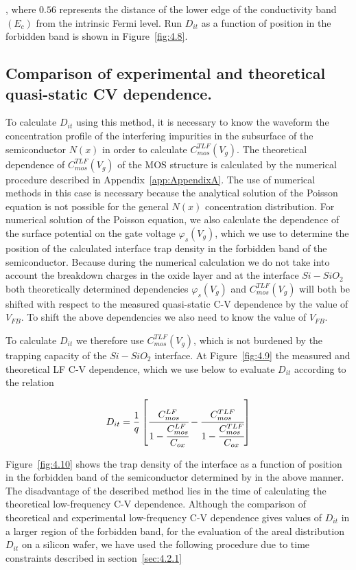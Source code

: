 , where $0.56$ represents the distance of the lower edge of the
conductivity band $(E_{c})$ from the intrinsic Fermi level. Run
$D_{it}$ as a function of position in the forbidden band is shown
in Figure~\ref{fig:4.8}.

\subsection{Comparison of experimental and theoretical quasi-static CV dependence.}\label{sec:4.2.2}

To calculate $D_{it}$ using this method, it is necessary to know the
waveform the concentration profile of the interfering impurities in
the subsurface of the semiconductor $N(x)$ in order to calculate
$C_{mos}^{TLF}(V_{g})$. The theoretical dependence of
$C_{mos}^{TLF}(V_{g})$ of the MOS structure is calculated by the
numerical procedure described in Appendix~\ref{app:AppendixA}.  The
use of numerical methods in this case is necessary because the
analytical solution of the Poisson equation is not possible for the
general $N(x)$ concentration distribution.  For numerical solution of
the Poisson equation, we also calculate the dependence of the surface
potential on the gate voltage $\varphi_{s}(V_{g})$, which we use to
determine the position of the calculated interface trap density in the
forbidden band of the semiconductor.  Because during the numerical
calculation we do not take into account the breakdown charges in the
oxide layer and at the interface $Si-SiO_{2}$ both theoretically
determined dependencies $\varphi_{s}(V_{g})$ and
$C_{mos}^{TLF}(V_{g})$ will both be shifted with respect to the
measured quasi-static C-V dependence by the value of $V_{FB}$. To
shift the above dependencies we also need to know the value of
$V_{FB}$.

\par To calculate $D_{it}$ we therefore use $C_{mos}^{TLF}(V_{g})$,
which is not burdened by the trapping capacity of the $Si-SiO_{2}$
interface. At Figure~\ref{fig:4.9} the measured and theoretical LF C-V
dependence, which we use below to evaluate $D_{it}$ according to the
relation

\begin{equation}\label{eq:4.18}
  D_{it} = \frac{1}{q} \left[\cfrac{C_{mos}^{LF}}{1-\cfrac{C_{mos}^{LF}}{C_{ox}}}-\cfrac{C_{mos}^{TLF}}{1-\cfrac{C_{mos}^{TLF}}{C_{ox}}}\right]
\end{equation}

Figure~\ref{fig:4.10} shows the trap density of the interface as a
function of position in the forbidden band of the semiconductor
determined by in the above manner.  The disadvantage of the described
method lies in the time of calculating the theoretical low-frequency
C-V dependence. Although the comparison of theoretical and
experimental low-frequency C-V dependence gives values of $D_{it}$ in
a larger region of the forbidden band, for the evaluation of the areal
distribution $D_{it}$ on a silicon wafer, we have used the following
procedure due to time constraints described in section~\ref{sec:4.2.1}

